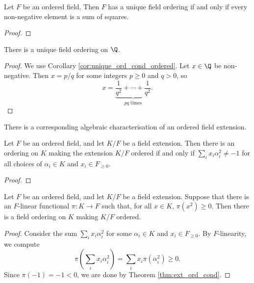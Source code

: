\begin{corollary}
  \label{cor:unique_ord_cond_ordered}
  \leanok
  Let $F$ be an ordered field. Then $F$ has a unique field ordering if and only if every non-negative element is a sum of squares.
\end{corollary}
\begin{proof}
  \leanok
\end{proof}

\begin{corollary}
  \label{cor:unique_ord_Q}
  \leanok
  There is a unique field ordering on $\Q$.
\end{corollary}
\begin{proof}
  \leanok
  We use Corollary \ref{cor:unique_ord_cond_ordered}. Let $x\in\Q$ be non-negative. Then $x=p/q$ for some integers $p\geq0$ and $q>0$, so 
  \[x=\underbrace{\frac{1}{q^2}+\cdots+\frac{1}{q^2}}_{pq\text{ times}}.\]
\end{proof}

There is a corresponding algebraic characterisation of an ordered field extension.

\begin{theorem}
  \label{thm:ext_ord_cond}
  \leanok
  Let $F$ be an ordered field, and let $K/F$ be a field extension. Then there is an ordering on $K$ making the extension $K/F$ ordered if and only if $\sum_i x_i\alpha_i^2\neq-1$ for all choices of $\alpha_i\in K$ and $x_i\in F_{\geq0}$.
\end{theorem}
\begin{proof}
  \leanok
\end{proof}

\begin{lemma}
  \label{lem:ext_ord_functional_suff}
  \leanok
  Let $F$ be an ordered field, and let $K/F$ be a field extension. Suppose that there is an $F$-linear functional $\pi:K\to F$ such that, for all $x\in K$, $\pi(x^2)\geq0$. Then there is a field ordering on $K$ making $K/F$ ordered.
\end{lemma}
\begin{proof}
  \leanok
  Consider the sum $\sum_i x_i\alpha_i^2$ for some $\alpha_i\in K$ and $x_i\in F_{\geq0}$. By $F$-linearity, we compute
  \[\pi\left(\sum_i x_i\alpha_i^2\right)=\sum_i x_i\pi(\alpha_i^2)\geq0.\]
  Since $\pi(-1)=-1<0$, we are done by Theorem \ref{thm:ext_ord_cond}.
\end{proof}


